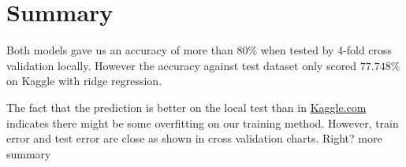\documentclass[10pt,conference,compsocconf]{IEEEtran}
\begin{document}



\section{Summary}
Both models gave us an accuracy of more than $80\%$ when tested by 4-fold cross validation locally. However the accuracy against test dataset only scored $77.748\%$ on Kaggle with ridge regression.

The fact that the prediction is better on the local test than in {\color{blue}\href{https://www.kaggle.com}{Kaggle.com}} indicates there might be some overfitting on our training method. {\color{red}However, train error and test error are close as shown in cross validation charts. Right?} more summary




\end{document}
